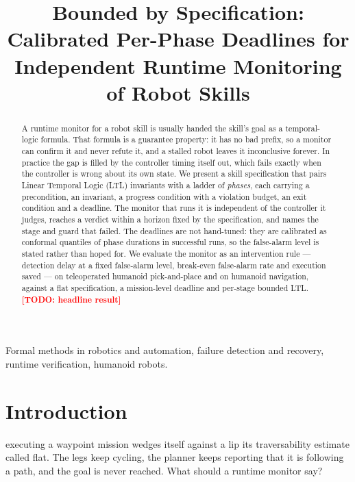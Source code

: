 \documentclass[letterpaper, 10pt, journal, twoside]{IEEEtran}
\title{Bounded by Specification: Calibrated Per-Phase Deadlines for
Independent Runtime Monitoring of Robot Skills}
\author{\TODO{authors, affiliations, funding, RA-L footnotes}}
\newcommand{\TODO}[1]{\textcolor{red}{\textbf{[TODO: #1]}}}
\begin{document}
\maketitle

\begin{abstract}
A runtime monitor for a robot skill is usually handed the skill's goal
as a temporal-logic formula. That formula is a guarantee property: it
has no bad prefix, so a monitor can confirm it and never refute it, and
a stalled robot leaves it inconclusive forever. In practice the gap is
filled by the controller timing itself out, which fails exactly when the
controller is wrong about its own state. We present a skill
specification that pairs Linear Temporal Logic (LTL) invariants with a
ladder of \emph{phases}, each carrying a precondition, an invariant, a
progress condition with a violation budget, an exit condition and a
deadline. The monitor that runs it is independent of the controller it
judges, reaches a verdict within a horizon fixed by the specification,
and names the stage and guard that failed. The deadlines are not
hand-tuned: they are calibrated as conformal quantiles of phase
durations in successful runs, so the false-alarm level is stated rather
than hoped for. We evaluate the monitor as an intervention rule ---
detection delay at a fixed false-alarm level, break-even false-alarm
rate and execution saved --- on teleoperated humanoid pick-and-place and
on humanoid navigation, against a flat specification, a mission-level
deadline and per-stage bounded LTL. \TODO{headline result}
\end{abstract}

\begin{IEEEkeywords}
Formal methods in robotics and automation, failure detection and
recovery, runtime verification, humanoid robots.
\end{IEEEkeywords}

\section{Introduction}

 executing a waypoint mission wedges itself
against a lip its traversability estimate called flat. The legs keep
cycling, the planner keeps reporting that it is following a path, and
the goal is never reached. What should a runtime monitor say?
\end{document}
